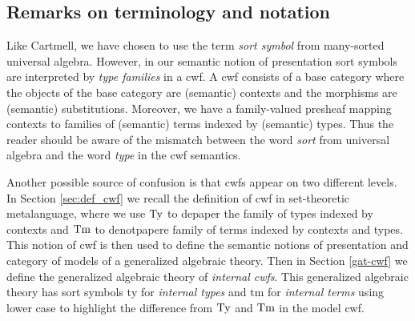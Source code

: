 \documentclass{mscs}
\newcommand{\FYI}[1]{{#1}}
\newcommand{\ty}{\mathrm{ty}}
\newcommand{\tm}{\mathrm{tm}}
\begin{document}


\subsection*{Remarks on terminology and notation}
Like Cartmell, we have chosen to use the term {\em sort symbol} from many-sorted universal algebra. However, in our semantic notion of \FYI{presentation} sort symbols are interpreted by {\em type families} in a cwf. A cwf consists of a base category where the objects of the base category are (semantic) contexts and the morphisms are (semantic) substitutions. Moreover, we have a family-valued presheaf mapping contexts to families of (semantic) terms indexed by (semantic) types. Thus the reader should be aware of the mismatch between the word {\em sort} from universal algebra and the word {\em type} in the cwf semantics.

Another possible source of confusion is that cwfs appear on two different levels. In Section \ref{sec:def_cwf} we recall the definition of cwf in set-theoretic metalanguage, where we use $\mathrm{Ty}$ to depaper the family of types indexed by contexts and $\mathrm{Tm}$ to denotpapere family of terms indexed by contexts and types. This notion of cwf is then used to define the semantic notions of \FYI{presentation} and category of models of a generalized algebraic theory. Then in Section \ref{gat-cwf} we define the generalized algebraic theory of {\em internal cwfs}. This generalized algebraic theory has sort symbols $\ty$ for {\em internal types} and $\tm$ for {\em internal terms} using lower case to highlight the difference from $\mathrm{Ty}$ and $\mathrm{Tm}$ in the model cwf.
\end{document}

